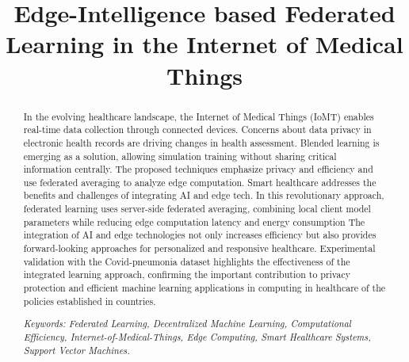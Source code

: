 \documentclass[conference]{IEEEtran}
\begin{document}
\title{Edge-Intelligence based Federated Learning in the Internet of Medical Things}
\author{
\and
{}
\and
{}
}
\maketitle

\begin{abstract}
In the evolving healthcare landscape, the Internet of Medical Things (IoMT) enables real-time data collection through connected devices. Concerns about data privacy in electronic health records are driving changes in health assessment. Blended learning is emerging as a solution, allowing simulation training without sharing critical information centrally. The proposed techniques emphasize privacy and efficiency and use federated averaging to analyze edge computation. Smart healthcare addresses the benefits and challenges of integrating AI and edge tech. In this revolutionary approach, federated learning uses server-side federated averaging, combining local client model parameters while reducing edge computation latency and energy consumption The integration of AI and edge technologies not only increases efficiency but also provides forward-looking approaches for personalized and responsive healthcare. Experimental validation with the Covid-pneumonia dataset highlights the effectiveness of the integrated learning approach, confirming the important contribution to privacy protection and efficient machine learning applications in computing in healthcare of the policies established in countries.

\textit{Keywords: Federated Learning, Decentralized Machine Learning, Computational Efficiency, Internet-of-Medical-Things, Edge Computing, Smart Healthcare Systems, Support Vector Machines.
}

\end{abstract}
\end{document}
